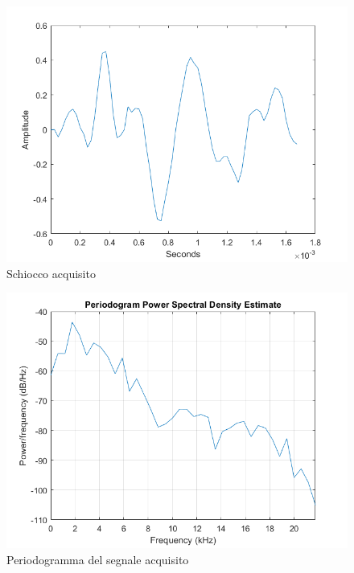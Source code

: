\documentclass[a4paper, titlepage]{article}
\begin{document}
\begin{figure}[H]
    \centering
    \includegraphics[scale=0.45]{sgn_camp.png}
    \caption{Schiocco acquisito}
    \label{fig:snap_acq}
\end{figure}

\begin{figure}[H]
    \centering
    \includegraphics[scale=0.45]{spettr_camp.png}
    \caption{Periodogramma del segnale acquisito}
    \label{fig:snap_per}
\end{figure}
\end{document}
